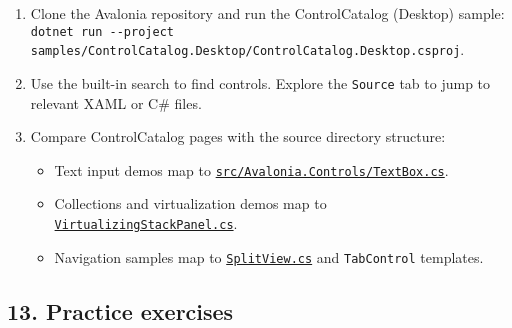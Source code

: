 \begin{enumerate}
\def\labelenumi{\arabic{enumi}.}
\tightlist
\item
  Clone the Avalonia repository and run the ControlCatalog (Desktop)
  sample:
  \passthrough{\lstinline!dotnet run --project samples/ControlCatalog.Desktop/ControlCatalog.Desktop.csproj!}.
\item
  Use the built-in search to find controls. Explore the
  \passthrough{\lstinline!Source!} tab to jump to relevant XAML or C\#
  files.
\item
  Compare ControlCatalog pages with the source directory structure:

  \begin{itemize}
  \tightlist
  \item
    Text input demos map to
    \href{https://github.com/AvaloniaUI/Avalonia/blob/master/src/Avalonia.Controls/TextBox.cs}{\passthrough{\lstinline!src/Avalonia.Controls/TextBox.cs!}}.
  \item
    Collections and virtualization demos map to
    \href{https://github.com/AvaloniaUI/Avalonia/blob/master/src/Avalonia.Controls/VirtualizingStackPanel.cs}{\passthrough{\lstinline!VirtualizingStackPanel.cs!}}.
  \item
    Navigation samples map to
    \href{https://github.com/AvaloniaUI/Avalonia/blob/master/src/Avalonia.Controls/SplitView/SplitView.cs}{\passthrough{\lstinline!SplitView.cs!}}
    and \passthrough{\lstinline!TabControl!} templates.
  \end{itemize}
\end{enumerate}

\subsection{13. Practice exercises}\label{practice-exercises}


